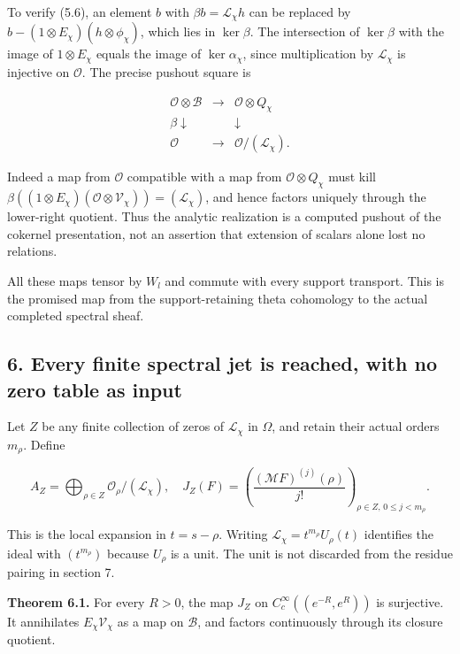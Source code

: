 \documentclass[
]{article}
\begin{document}
To verify (5.6), an element \(b\) with \(\beta b=\mathscr L_\chi h\) can
be replaced by \(b-(1\otimes E_\chi)(h\otimes\phi_\chi)\), which lies in
\(\ker\beta\). The intersection of \(\ker\beta\) with the image of
\(1\otimes E_\chi\) equals the image of \(\ker\alpha_\chi\), since
multiplication by \(\mathscr L_\chi\) is injective on \(\mathcal O\).
The precise pushout square is

\[
\begin{array}{ccc}
\mathcal O\otimes\mathscr B&\longrightarrow&\mathcal O\otimes Q_\chi\\
\beta\downarrow&&\downarrow\\
\mathcal O&\longrightarrow&\mathcal O/(\mathscr L_\chi).
\end{array}
\]

Indeed a map from \(\mathcal O\) compatible with a map from
\(\mathcal O\otimes Q_\chi\) must kill
\(\beta((1\otimes E_\chi)(\mathcal O\otimes\mathscr V_\chi))=(\mathscr L_\chi)\),
and hence factors uniquely through the lower-right quotient. Thus the
analytic realization is a computed pushout of the cokernel presentation,
not an assertion that extension of scalars alone lost no relations.

All these maps tensor by \(W_l\) and commute with every support
transport. This is the promised map from the support-retaining theta
cohomology to the actual completed spectral sheaf.

\subsection{6. Every finite spectral jet is reached, with no zero table
as
input}\label{every-finite-spectral-jet-is-reached-with-no-zero-table-as-input}

Let \(Z\) be any finite collection of zeros of \(\mathscr L_\chi\) in
\(\Omega\), and retain their actual orders \(m_\rho\). Define

\[
A_Z=\bigoplus_{\rho\in Z}\mathcal O_\rho/(\mathscr L_\chi),
\quad
J_Z(F)=\left(\frac{(\mathcal MF)^{(j)}(\rho)}{j!}\right)_{\rho\in Z,\,0\le j<m_\rho}.
\]

This is the local expansion in \(t=s-\rho\). Writing
\(\mathscr L_\chi=t^{m_\rho}U_\rho(t)\) identifies the ideal with
\((t^{m_\rho})\) because \(U_\rho\) is a unit. The unit is not discarded
from the residue pairing in section 7.

\textbf{Theorem 6.1.} For every \(R>0\), the map \(J_Z\) on
\(C_c^\infty((e^{-R},e^R))\) is surjective. It annihilates
\(E_\chi\mathscr V_\chi\) as a map on \(\mathscr B\), and factors
continuously through its closure quotient.
\end{document}
